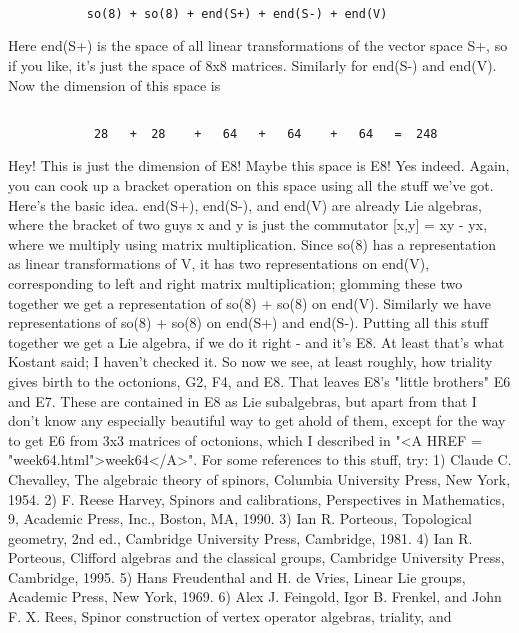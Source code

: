 \begin{verbatim}

           so(8) + so(8) + end(S+) + end(S-) + end(V)
\end{verbatim}
    
Here end(S+) is the space of all linear transformations of
the vector space S+, so if you like, it's just the space
of 8x8 matrices.  Similarly for end(S-) and end(V).  Now the
dimension of this space is

\begin{verbatim}

            28   +  28    +   64   +   64    +   64   =  248
\end{verbatim}
    
Hey!  This is just the dimension of E8!  Maybe this space is E8!
Yes indeed.  Again, you can cook up a bracket operation on 
this space using all the stuff we've got.  Here's the basic
idea.  end(S+), end(S-), and end(V) are already Lie algebras,
where the bracket of two guys x and y is just the commutator
[x,y] = xy - yx, where we multiply using matrix multiplication.
Since so(8) has a representation as linear transformations of
V, it has two representations on end(V), corresponding to left
and right matrix multiplication; glomming these two together
we get a representation of so(8) + so(8) on end(V).  Similarly
we have representations of so(8) + so(8) on end(S+) and end(S-).
Putting all this stuff together we get a Lie algebra, if we
do it right - and it's E8.  At least that's what Kostant said;
I haven't checked it.
So now we see, at least roughly, how triality gives birth
to the octonions, G2, F4, and E8.  That leaves E8's "little
brothers" E6 and E7.  These are contained in E8 as Lie subalgebras,
but apart from that I don't know any especially beautiful way 
to get ahold of them, except for the way to get E6 from 3x3
matrices of octonions, which I described in "<A HREF = 
"week64.html">week64</A>".  
For some references to this stuff, try:
1) Claude C. Chevalley, The algebraic theory of spinors, 
Columbia University Press, New York, 1954.
2) F. Reese Harvey, Spinors and calibrations, Perspectives in 
Mathematics, 9, Academic Press, Inc., Boston, MA, 1990.
3) Ian R. Porteous, Topological geometry, 2nd ed., Cambridge University 
Press, Cambridge, 1981.
4) Ian R. Porteous, Clifford algebras and the classical groups,
Cambridge University Press, Cambridge, 1995.  
5) Hans Freudenthal and H. de Vries, Linear Lie groups, Academic Press, 
New York, 1969.
6) Alex J. Feingold, Igor B. Frenkel, and John F. X. Rees,
Spinor construction of vertex operator algebras, triality, and
